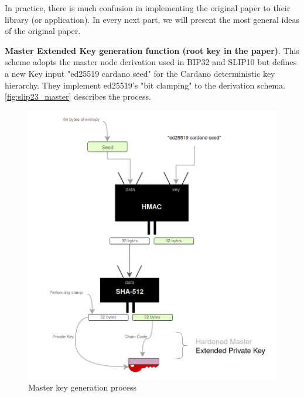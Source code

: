 In practice, there is much confusion in implementing the original paper to their library (or application). In every next part, we will present the most general ideas of the original paper.

\bigskip
{\textbf{Master Extended Key generation function (root key in the paper)}}. This scheme adopts the master node derivation used in BIP32 and SLIP10 but defines a new Key input "ed25519 cardano seed" for the Cardano deterministic key hierarchy. They implement ed25519's "bit clamping" to the derivation schema.
\autoref{fig:slip23_master} describes the process.

\begin{figure}[ht!]
    \centering
    \includegraphics[width=1\textwidth]{images/slip23_master.png}
    \caption[Master key generation process]{Master key generation process}
    \label{fig:slip23_master}
\end{figure}

